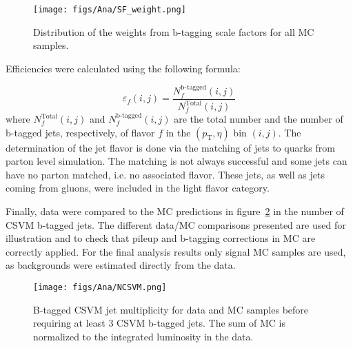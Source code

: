 
\begin{figure}[!Hhtbp]
  \begin{center}
    \texttt{[image: figs/Ana/SF\_weight.png]}
    \caption{Distribution of the weights from b-tagging scale factors for all MC samples.}
    \label{fig:SFweight}
  \end{center}
\end{figure}

Efficiencies were calculated using the following formula:

\begin{equation}
  \label{eq:btaggingeff}
  \varepsilon_f(i,j) = \frac{N_f^\text{b-tagged}(i,j)}{N_f^\text{Total}(i,j)}
\end{equation} where $ N_f^\text{Total}(i,j) $ and $ N_f^\text{b-tagged}(i,j) $ are the total number and the number of b-tagged jets, respectively, of flavor $ f $ in the $ (p_\text{T},\eta) $ bin $ (i,j) $. The determination of the jet flavor is done via the matching of jets to quarks from parton level simulation. The matching is not always successful and some jets can have no parton matched, i.e. no associated flavor. These jets, as well as jets coming from gluons, were included in the light flavor category.

Finally, data were compared to the MC predictions in figure~\ref{fig:Nb} in the number of CSVM b-tagged jets. The different data/MC comparisons presented are used for illustration and to check that pileup and b-tagging corrections in MC are correctly applied. For the final analysis results only signal MC samples are used, as backgrounds were estimated directly from the data.

\begin{figure}[!Hhtbp]
  \begin{center}
    \texttt{[image: figs/Ana/NCSVM.png]}
    \caption{B-tagged CSVM jet multiplicity for data and MC samples before requiring at least 3 CSVM b-tagged jets. The sum of MC is normalized to the integrated luminosity in the data.}
    \label{fig:Nb}
  \end{center}
\end{figure}

